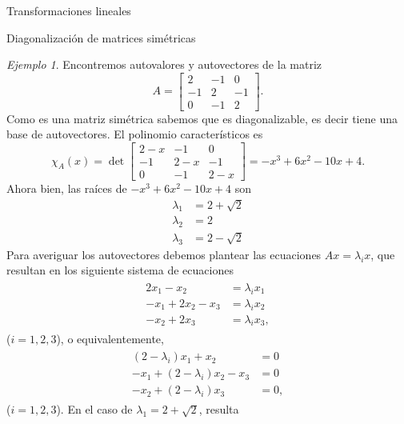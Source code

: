 \documentclass[a4paper,12pt,twoside,spanish,reqno]{amsbook}
\numberwithin{equation}{section}
\theoremstyle{definition}
\theoremstyle{remark}
\newtheorem*{ejemplo*}{Ejemplo}
\begin{document}
\begin{chapter}{Transformaciones lineales}
\begin{section}{Diagonalización de matrices simétricas}
    \begin{ejemplo*} Encontremos autovalores y autovectores de  la matriz
        \begin{equation*}
            A = \begin{bmatrix} 2&-1&0\\-1&2&-1\\0&-1&2 \end{bmatrix}.
        \end{equation*}
        Como es una matriz simétrica sabemos que es diagonalizable, es decir tiene una base de autovectores. 
        El polinomio característicos es
        \begin{equation*}
            \chi_A(x) = \det  \begin{bmatrix} 2-x&-1&0\\-1&2-x&-1\\0&-1&2-x \end{bmatrix} =	-x^3 + 6 x^2 - 10 x + 4.
        \end{equation*}
        Ahora bien, las raíces de $-x^3 + 6 x^2 - 10 x + 4 $  son 
        \begin{align*}
            \lambda_1 &= 2 + \sqrt 2 \\
            \lambda_2 &= 2 \\
            \lambda_3 &= 2 - \sqrt 2
        \end{align*}
        Para averiguar los autovectores debemos plantear las ecuaciones $Ax = \lambda_ix$,  que resultan en los siguiente sistema de ecuaciones
        \begin{align*}
        \begin{split}
        2x_1 - x_2  &= \lambda_i x_1 \\
        -x_1 + 2x_2 -x_3 &=\lambda_ix_2 \\
        -x_2 + 2x_3 &= \lambda_ix_3,  
        \end{split}
        \end{align*}
        ($i=1,2,3$),  o equivalentemente,
        \begin{align*}
        \begin{split}
        (2 -\lambda_i)x_1+ x_2  &= 0 \\
        -x_1 +(2-\lambda_i)x_2  -x_3 &=0 \\
        -x_2 + (2-\lambda_i)x_3 &= 0,  
        \end{split}
        \end{align*}
        ($i=1,2,3$).
        En el caso de $\lambda_1= 2 + \sqrt 2$,  resulta
        \begin{align*}

\end{align*}
\end{ejemplo*}
\end{section}
\end{chapter}
\end{document}
